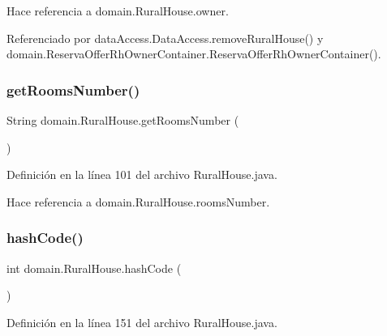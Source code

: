 Hace referencia a domain.\+Rural\+House.\+owner.



Referenciado por data\+Access.\+Data\+Access.\+remove\+Rural\+House() y domain.\+Reserva\+Offer\+Rh\+Owner\+Container.\+Reserva\+Offer\+Rh\+Owner\+Container().

\mbox{\label{classdomain_1_1_rural_house_a3d0d3fd77f1e271f1af5793ad77f6792}} 
\subsubsection{\texorpdfstring{getRoomsNumber()}{getRoomsNumber()}}
{\footnotesize\ttfamily String domain.\+Rural\+House.\+get\+Rooms\+Number (\begin{DoxyParamCaption}{ }\end{DoxyParamCaption})}



Definición en la línea 101 del archivo Rural\+House.\+java.


\begin{DoxyCode}{0}

\end{DoxyCode}


Hace referencia a domain.\+Rural\+House.\+rooms\+Number.

\mbox{\label{classdomain_1_1_rural_house_a23272d170821f464d6b07595303c283e}} 
\subsubsection{\texorpdfstring{hashCode()}{hashCode()}}
{\footnotesize\ttfamily int domain.\+Rural\+House.\+hash\+Code (\begin{DoxyParamCaption}{ }\end{DoxyParamCaption})}



Definición en la línea 151 del archivo Rural\+House.\+java.


